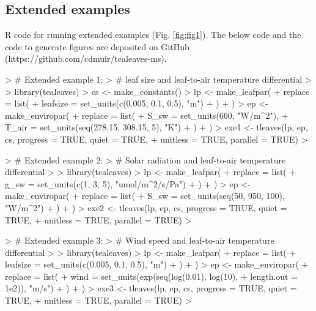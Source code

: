 \documentclass[11pt, oneside]{article}
\begin{document}
\clearpage


\subsection*{Extended examples}

R code for running extended examples (Fig. \ref{fig:fig1}). The below code and the code to generate figures are deposited on GitHub (https://github.com/cdmuir/tealeaves-ms).
 
\begin{Schunk}
\begin{Sinput}
> # Extended example 1: 
> # leaf size and leaf-to-air temperature differential
> 
> library(tealeaves)
> cs <- make_constants()
> lp  <- make_leafpar(
+   replace = list(
+     leafsize = set_units(c(0.005, 0.1, 0.5), "m")
+   )
+ )
> ep <- make_enviropar(
+   replace = list(
+     S_sw = set_units(660, "W/m^2"),
+     T_air = set_units(seq(278.15, 308.15, 5), "K")
+   )
+ )
> exe1 <- tleaves(lp, ep, cs, progress = TRUE, quiet = TRUE, 
+                 unitless = TRUE, parallel = TRUE)
> 
\end{Sinput}
\end{Schunk}

\clearpage

\begin{Schunk}
\begin{Sinput}
> # Extended example 2: 
> # Solar radiation and leaf-to-air temperature differential
> 
> library(tealeaves)
> lp  <- make_leafpar(
+   replace = list(
+     g_sw = set_units(c(1, 3, 5), "umol/m^2/s/Pa")
+   )
+ )
> ep <- make_enviropar(
+   replace = list(
+     S_sw = set_units(seq(50, 950, 100), "W/m^2")
+   )
+ )
> exe2 <- tleaves(lp, ep, cs, progress = TRUE, quiet = TRUE, 
+                 unitless = TRUE, parallel = TRUE)
> 
\end{Sinput}
\end{Schunk}

\clearpage

\begin{Schunk}
\begin{Sinput}
> # Extended example 3: 
> # Wind speed and leaf-to-air temperature differential
> 
> library(tealeaves)
> lp  <- make_leafpar(
+   replace = list(
+     leafsize = set_units(c(0.005, 0.1, 0.5), "m")
+   )
+ )
> ep <- make_enviropar(
+   replace = list(
+     wind = set_units(exp(seq(log(0.01), log(10), 
+                              length.out = 1e2)), "m/s")
+   )
+ )
> exe3 <- tleaves(lp, ep, cs, progress = TRUE, quiet = TRUE, 
+                 unitless = TRUE, parallel = TRUE)
> 
\end{Sinput}
\end{Schunk}
\end{document}
